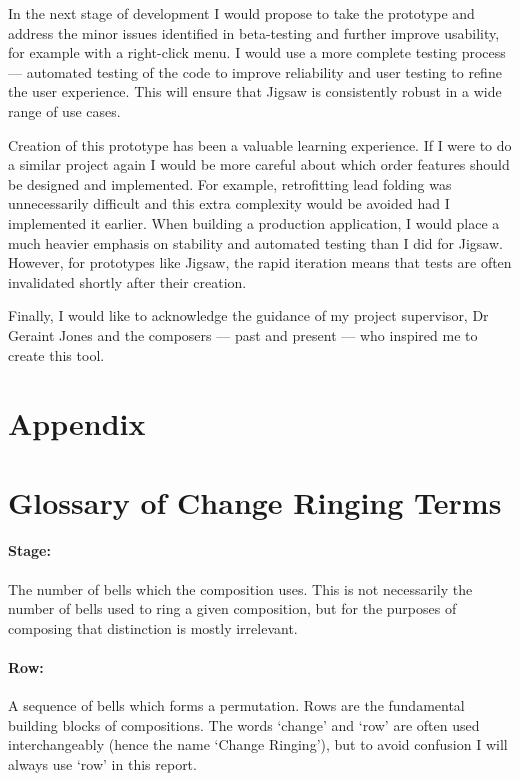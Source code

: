 \documentclass[12pt]{article}
\begin{document}
In the next stage of development I would propose to take the prototype and address the minor issues
identified in beta-testing and further improve usability, for example with a right-click menu. I
would use a more complete testing process --- automated testing of the code to improve reliability
and user testing to refine the user experience.  This will ensure that Jigsaw is consistently
robust in a wide range of use cases.

Creation of this prototype has been a valuable learning experience.  If I were to do a similar
project again I would be more careful about which order features should be designed and implemented.
For example, retrofitting lead folding was unnecessarily difficult and this extra complexity would
be avoided had I implemented it earlier.  When building a production application, I would place a
much heavier emphasis on stability and automated testing than I did for Jigsaw.  However, for
prototypes like Jigsaw, the rapid iteration means that tests are often invalidated shortly after
their creation.

Finally, I would like to acknowledge the guidance of my project supervisor, Dr Geraint Jones and the
composers --- past and present --- who inspired me to create this tool.



\pagebreak

\section{Appendix}

\appendix

\section{Glossary of Change Ringing Terms}\label{sec:glossary}

\paragraph{Stage:} The number of bells which the composition uses.  This is not necessarily the
number of bells used to ring a given composition, but for the purposes of composing that
distinction is mostly irrelevant.

\paragraph{Row:} A sequence of bells which forms a permutation.  Rows are the fundamental building
blocks of compositions.  The words `change' and `row' are often used interchangeably (hence the name
`Change Ringing'), but to avoid confusion I will always use `row' in this report.
\end{document}
